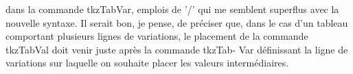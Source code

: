 dans la commande tkzTabVar, emplois de ’/’ qui me semblent superflus avec la nouvelle syntaxe. Il serait bon, je pense, de préciser que, dans le cas d’un tableau comportant plusieurs lignes de variations, le placement de la commande tkzTabVal doit venir juste après la commande tkzTab- Var définissant la ligne de variations sur laquelle on souhaite placer les valeurs intermédiaires.